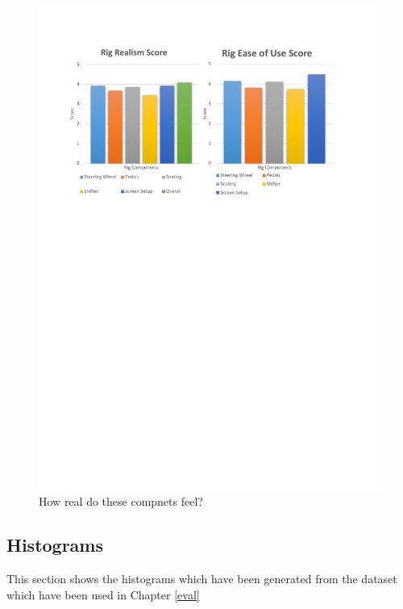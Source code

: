 \begin{figure}[!htb]
	\centering
	\includegraphics[width=\textwidth]{charts/rigRealisim.pdf}
	\caption[Participants rig realisim score]{How real do these compnets feel?}
	\label{fig:chart-realistic}
\end{figure}

\subsection{Histograms}

This section shows the histograms which have been generated from the dataset which have been used in Chapter \ref{eval}

